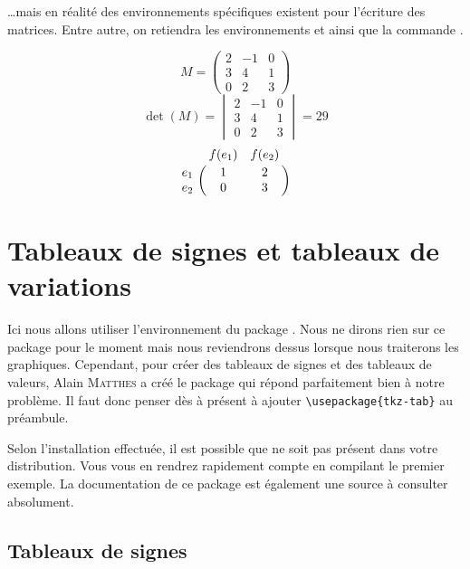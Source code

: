 \dots mais en réalité des environnements spécifiques existent pour l'écriture des matrices. Entre autre, on retiendra les environnements  et  ainsi que la commande .\bigskip

{\NewFont
\begin{SideBySideExample}
    \[M =
    	\begin{pmatrix}
    		2 & -1 & 0 \\
            3 & 4 & 1 \\
            0 & 2 & 3
    	\end{pmatrix}
    \]\medskip
    \[\det(M) =
    	\begin{vmatrix}
    		2 & -1 & 0 \\
            3 & 4 & 1 \\
            0 & 2 & 3
    	\end{vmatrix} = 29
    \]\medskip
    \[
        \bordermatrix{
            & f(e_1) & f(e_2) \cr
        e_1 & 1 & 2 \cr
        e_2 & 0 & 3 \cr}
    \]
\end{SideBySideExample}
}\bigskip

\section{Tableaux de signes et tableaux de variations}

Ici nous allons utiliser l'environnement  du package . Nous ne dirons rien sur ce package pour le moment mais nous reviendrons dessus lorsque nous traiterons les graphiques. Cependant, pour créer des tableaux de signes et des tableaux de valeurs, Alain \textsc{Matthes} a créé le package  qui répond parfaitement bien à notre problème. Il faut donc penser dès à présent à ajouter \verb!\usepackage{tkz-tab}! au préambule.

\begin{info}
    Selon l'installation effectuée, il est possible que  ne soit pas présent dans votre distribution. Vous vous en rendrez rapidement compte en compilant le premier exemple. La documentation de ce package est également une source à consulter absolument.
\end{info}

\subsection{Tableaux de signes}

